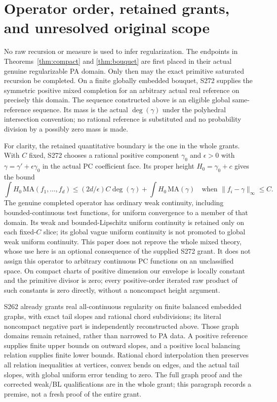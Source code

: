 \documentclass[11pt]{article}
\theoremstyle{definition}\newtheorem{definition}[theorem]{Definition}
\theoremstyle{remark}\newtheorem{remark}[theorem]{Remark}
\begin{document}
\section{Operator order, retained grants, and unresolved original scope}
No raw recursion or measure is used to infer regularization. The endpoints in Theorems~\ref{thm:compact} and \ref{thm:bouquet} are first placed in their actual genuine regularizable PA domain. Only then may the exact primitive saturated recursion be completed. On a finite globally embedded bouquet, S272 supplies the symmetric positive mixed completion for an arbitrary actual real reference on precisely this domain. The sequence constructed above is an eligible global same-reference sequence. Its mass is the actual $\deg(\gamma)$ under the polyhedral intersection convention; no rational reference is substituted and no probability division by a possibly zero mass is made.

For clarity, the retained quantitative boundary is the one in the whole grants. With $C$ fixed, S272 chooses a rational positive component $\gamma_0$ and $\epsilon>0$ with $\gamma=\gamma'+\epsilon\gamma_0$ in the actual PC coefficient face. Its proper height $H_0=\gamma_0+c$ gives the bound
\[
 \int H_0\,\mathrm{MA}(f_1,\ldots,f_d)
 \leq (2d/\epsilon)C\deg(\gamma)+\int H_0\,\mathrm{MA}(\gamma)
 \quad\text{when }\|f_i-\gamma\|_\infty\leq C.
\]
The genuine completed operator has ordinary weak continuity, including bounded-continuous test functions, for uniform convergence to a member of that domain. Its weak and bounded-Lipschitz uniform continuity is retained only on each fixed-$C$ slice; its global vague uniform continuity is not promoted to global weak uniform continuity. This paper does not reprove the whole mixed theory, whose use here is an optional consequence of the supplied S272 grant. It does not assign this operator to arbitrary continuous PC functions on an unclassified space. On compact charts of positive dimension our envelope is locally constant and the primitive divisor is zero; every positive-order iterated raw product of such constants is zero directly, without a noncompact height argument.

S262 already grants real all-continuous regularity on finite balanced embedded graphs, with exact tail slopes and rational chord subdivisions; its literal noncompact negative part is independently reconstructed above. Those graph domains remain retained, rather than narrowed to PA data. A positive reference supplies finite upper bounds on outward slopes, and a positive local balancing relation supplies finite lower bounds. Rational chord interpolation then preserves all relation inequalities at vertices, convex bends on edges, and the actual tail slopes, with global uniform error tending to zero. The full graph proof and the corrected weak/BL qualifications are in the whole grant; this paragraph records a premise, not a fresh proof of the entire grant.
\end{document}
